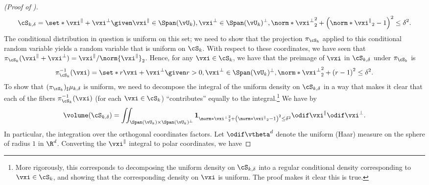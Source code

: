\documentclass[../../book-main.tex]{subfiles}
\begin{document}
\begin{proof}[(Proof of )]
\begin{equation}
        \cS_{k, \delta} = \set*{
            \vxi^{\|} + \vxi^{\perp}
            \given
            \vxi^{\|} \in \Span(\vU_k),
            \vxi^{\perp} \in \Span(\vU_k)^\perp,
            \norm*{\vxi^{\perp}}_2^2
            + \left( \norm*{\vxi^{\|}}_2 - 1 \right)^2
            \leq
            \delta^{2}
        }.
    \end{equation}
    The conditional distribution in question is uniform on this set; we need to
    show that the projection $\pi_{\cS_k}$ applied to this conditional random
    variable yields a random variable that is uniform on $\cS_k$.
    With respect to these coordinates, we have seen that $\pi_{\cS_k}(\vxi^\|
    + \vxi^\perp) = \vxi^\| / \norm{\vxi^{\|}}_2$.
    Hence, for any $\vxi \in \cS_{k}$, we have that the preimage of $\vxi$ in
    $\cS_{k, \delta}$ under $\pi_{\cS_k}$ is
    \begin{equation}
        \pi_{\cS_k}^{-1}(\vxi) = \set*{
            r\vxi + \vxi^\perp
            \given
            r > 0,
            \vxi^{\perp} \in \Span(\vU_k)^\perp,
            \norm*{\vxi^{\perp}}_2^2
            + \left( r - 1 \right)^2
            \leq
            \delta^{2}
        }.
        \label{eq:fiber-of-uos}
    \end{equation}
    To show that $(\pi_{\cS_k})_{\sharp} \mu_{k, \delta}$ is uniform, we need to
    decompose the integral of the uniform density on $\cS_{k, \delta}$ in a way
    that makes it clear that each of the fibers
    $\pi_{\cS_k}^{-1}(\vxi)$ (for each $\vxi \in \cS_k$) ``contributes'' equally
    to the integral.\footnote{More rigorously, this corresponds to decomposing
        the uniform density on $\cS_{k, \delta}$ into a regular
        conditional density
        corresponding to $\vxi \in \cS_{k}$, and showing that the corresponding
    density on $\vxi$ is uniform. The proof makes it clear this is true.}
    We have by 
    \begin{equation}
        \volume(\cS_{k, \delta})
        = \iint_{\Span(\vU_k) \times \Span(\vU_k)^\perp} \mathbf{1}_{
            \norm*{\vxi^{\perp}}_2^2
            + \left( \norm*{\vxi^{\|}}_2 - 1 \right)^2
            \leq
            \delta^{2}
        }
        \odif \vxi^{\|} \odif \vxi^{\perp}.
    \end{equation}
    In particular, the integration over the orthogonal coordinates factors.
    Let $\odif \vtheta^{d}$ denote the uniform (Haar) measure on the sphere of
    radius $1$ in $\R^d$. Converting the $\vxi^{\|}$ integral to polar
    coordinates, we have

\end{proof}
\end{document}
